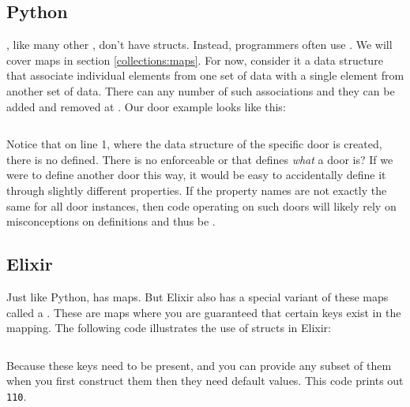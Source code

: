 
\subsection{Python}

, like many other , don't have structs. Instead, programmers often use . We will cover maps in section \ref{collections:maps}. For now, consider it a data structure that associate individual elements from one set of data with a single element from another set of data. There can any number of such associations and they can be added and removed at . Our door example looks like this:

\inputminted[firstline=3,linenos,firstnumber=1]{python}{../src/python/primdata/maps/maps.py}

Notice that on line 1, where the data structure of the specific door is created, there is no   defined. There is no enforceable  or  that defines \textsl{what} a door is? If we were to define another door this way, it would be easy to accidentally define it through slightly different properties. If the property names are not exactly the same for all door instances, then code operating on such doors will likely rely on misconceptions on definitions and thus be .

\subsection{Elixir}

Just like Python,  has maps. But Elixir also has a special variant of these maps called a . These are maps where you are guaranteed that certain keys exist in the mapping. The following code illustrates the use of structs in Elixir:

\inputminted[firstline=5]{elixir}{../src/elixir/primdata/struct/struct.exs}

Because these keys need to be present, and you can provide any subset of them when you first construct them then they need default values. This code prints out \texttt{110}.

